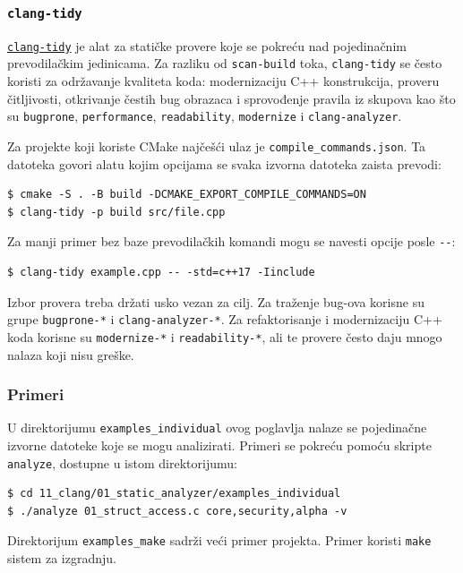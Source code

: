\subsubsection{\texorpdfstring{\texttt{clang-tidy}}{clang-tidy}}\label{clang-tidy}

\href{https://clang.llvm.org/extra/clang-tidy/}{\texttt{clang-tidy}} je alat za statičke provere koje se pokreću nad pojedinačnim prevodilačkim jedinicama. Za razliku od \texttt{scan-build} toka, \texttt{clang-tidy} se često koristi za održavanje kvaliteta koda: modernizaciju C++ konstrukcija, proveru čitljivosti, otkrivanje čestih bug obrazaca i sprovođenje pravila iz skupova kao što su \texttt{bugprone}, \texttt{performance}, \texttt{readability}, \texttt{modernize} i \texttt{clang-analyzer}.

Za projekte koji koriste CMake najčešći ulaz je \texttt{compile\_commands.json}. Ta datoteka govori alatu kojim opcijama se svaka izvorna datoteka zaista prevodi:

\begin{verbatim}
$ cmake -S . -B build -DCMAKE_EXPORT_COMPILE_COMMANDS=ON
$ clang-tidy -p build src/file.cpp
\end{verbatim}

Za manji primer bez baze prevodilačkih komandi mogu se navesti opcije posle \texttt{-\/-}:

\begin{verbatim}
$ clang-tidy example.cpp -- -std=c++17 -Iinclude
\end{verbatim}

Izbor provera treba držati usko vezan za cilj. Za traženje bug-ova korisne su grupe \texttt{bugprone-*} i \texttt{clang-analyzer-*}. Za refaktorisanje i modernizaciju C++ koda korisne su \texttt{modernize-*} i \texttt{readability-*}, ali te provere često daju mnogo nalaza koji nisu greške.

\subsubsection{Primeri}\label{clang-primeri}

U direktorijumu \texttt{examples\_individual} ovog poglavlja nalaze se pojedinačne izvorne datoteke koje se mogu analizirati. Primeri se pokreću pomoću skripte \texttt{analyze}, dostupne u istom direktorijumu:

\begin{verbatim}
$ cd 11_clang/01_static_analyzer/examples_individual
$ ./analyze 01_struct_access.c core,security,alpha -v
\end{verbatim}

Direktorijum \texttt{examples\_make} sadrži veći primer projekta. Primer koristi \texttt{make} sistem za izgradnju.
